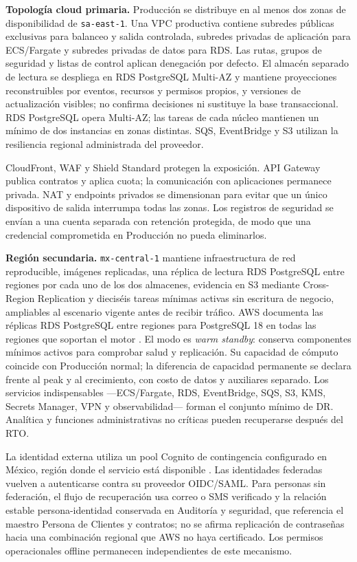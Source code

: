 \textbf{Topología cloud primaria.} Producción se distribuye en al menos dos zonas de disponibilidad de \texttt{sa-east-1}. Una VPC productiva contiene subredes públicas exclusivas para balanceo y salida controlada, subredes privadas de aplicación para ECS/Fargate y subredes privadas de datos para RDS. Las rutas, grupos de seguridad y listas de control aplican denegación por defecto. El almacén separado de lectura se despliega en RDS PostgreSQL Multi-AZ y mantiene proyecciones reconstruibles por eventos, recursos y permisos propios, y versiones de actualización visibles; no confirma decisiones ni sustituye la base transaccional. RDS PostgreSQL opera Multi-AZ; las tareas de cada núcleo mantienen un mínimo de dos instancias en zonas distintas. SQS, EventBridge y S3 utilizan la resiliencia regional administrada del proveedor.

CloudFront, WAF y Shield Standard protegen la exposición. API Gateway publica contratos y aplica cuota; la comunicación con aplicaciones permanece privada. NAT y endpoints privados se dimensionan para evitar que un único dispositivo de salida interrumpa todas las zonas. Los registros de seguridad se envían a una cuenta separada con retención protegida, de modo que una credencial comprometida en Producción no pueda eliminarlos.

\textbf{Región secundaria.} \texttt{mx-central-1} mantiene infraestructura de red reproducible, imágenes replicadas, una réplica de lectura RDS PostgreSQL entre regiones por cada uno de los dos almacenes, evidencia en S3 mediante Cross-Region Replication y dieciséis tareas mínimas activas sin escritura de negocio, ampliables al escenario vigente antes de recibir tráfico. AWS documenta las réplicas RDS PostgreSQL entre regiones para PostgreSQL 18 en todas las regiones que soportan el motor \parencite{aws-rds-crossregion}. El modo es \emph{warm standby}: conserva componentes mínimos activos para comprobar salud y replicación. Su capacidad de cómputo coincide con Producción normal; la diferencia de capacidad permanente se declara frente al peak y al crecimiento, con costo de datos y auxiliares separado. Los servicios indispensables —ECS/Fargate, RDS, EventBridge, SQS, S3, KMS, Secrets Manager, VPN y observabilidad— forman el conjunto mínimo de DR. Analítica y funciones administrativas no críticas pueden recuperarse después del RTO.

La identidad externa utiliza un pool Cognito de contingencia configurado en México, región donde el servicio está disponible \parencite{aws-cognito-mexico}. Las identidades federadas vuelven a autenticarse contra su proveedor OIDC/SAML. Para personas sin federación, el flujo de recuperación usa correo o SMS verificado y la relación estable persona-identidad conservada en Auditoría y seguridad, que referencia el maestro Persona de Clientes y contratos; no se afirma replicación de contraseñas hacia una combinación regional que AWS no haya certificado. Los permisos operacionales offline permanecen independientes de este mecanismo.

